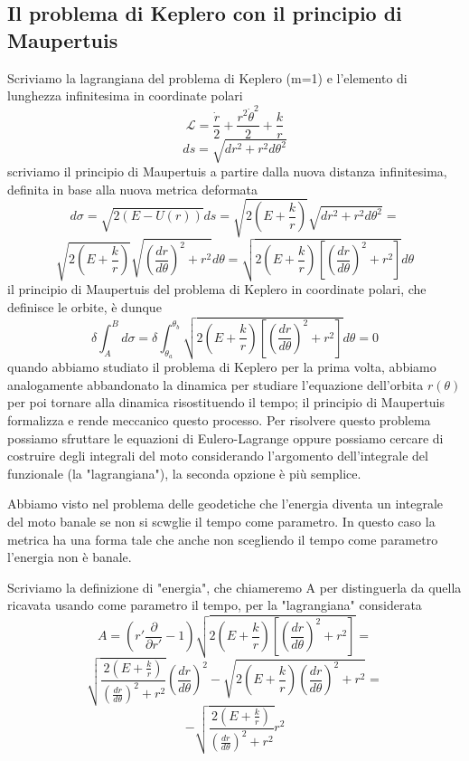 \documentclass[
10pt, %
a4paper, %
oneside, %
headinclude,footinclude, %
BCOR5mm, %
]{scrartcl}
\begin{document}
\subsection{Il problema di Keplero con il principio di Maupertuis}
Scriviamo la lagrangiana del problema di Keplero (m=1) e l'elemento di lunghezza infinitesima in coordinate polari
\[\mathcal{L} = \frac{\dot{r}}{2}+\frac{r^2\dot{\theta}^2}{2}+\frac{k}{r}\]
\[ds = \sqrt{dr^2+r^2d\theta^2}\]
scriviamo il principio di Maupertuis a partire dalla nuova distanza infinitesima, definita in base alla nuova metrica deformata
\[d\sigma  = \sqrt{2(E-U(r))}ds = \sqrt{2\left(E+\frac{k}{r}\right)}\sqrt{dr^2+r^2d\theta^2}=\] \[\sqrt{2\left(E+\frac{k}{r}\right)}\sqrt{\left(\frac{dr}{d\theta}\right)^2+r^2}d\theta = \sqrt{2\left(E+\frac{k}{r}\right)\left[\left(\frac{dr}{d\theta}\right)^2+r^2\right]}d\theta\]
il principio di Maupertuis del problema di Keplero in coordinate polari, che definisce le orbite, è dunque
\[\delta\int_{A}^{B}d\sigma = \delta\int_{\theta_a}^{\theta_b}\sqrt{2\left(E+\frac{k}{r}\right)\left[\left(\frac{dr}{d\theta}\right)^2+r^2\right]}d\theta =0 \]
quando abbiamo studiato il problema di Keplero per la prima volta, abbiamo analogamente abbandonato la dinamica per studiare l'equazione dell'orbita \(r(\theta)\) per poi tornare alla dinamica risostituendo il tempo; il principio di Maupertuis formalizza e rende meccanico questo processo.
Per risolvere questo problema possiamo sfruttare le equazioni di Eulero-Lagrange oppure possiamo cercare di costruire degli integrali del moto considerando l'argomento dell'integrale del funzionale (la "lagrangiana"), la seconda opzione è più semplice.  
\begin{osservazione}
	Abbiamo visto nel problema delle geodetiche che l'energia diventa un integrale del moto banale se non si scwglie il tempo come parametro. In questo caso la metrica ha una forma tale che anche non scegliendo il tempo come parametro l'energia non è banale.
\end{osservazione}
Scriviamo la definizione di "energia", che chiameremo A per distinguerla da quella ricavata usando come parametro il tempo, per la "lagrangiana" considerata
\[A = \left(r'\frac{\partial}{\partial r'}-1\right)\sqrt{2\left(E+\frac{k}{r}\right)\left[\left(\frac{dr}{d\theta}\right)^2+r^2\right]}=\]
\[\sqrt{\frac{2(E+\frac{k}{r})}{\left(\frac{dr}{d\theta}\right)^2+r^2}}\left(\frac{dr}{d\theta}\right)^2-\sqrt{2\left(E+\frac{k}{r}\right)\left(\frac{dr}{d\theta}\right)^2+r^2}=\]
\[-\sqrt{\frac{2\left(E+\frac{k}{r}\right)}{\left(\frac{dr}{d\theta}\right)^2+r^2}}r^2\]
\end{document}
